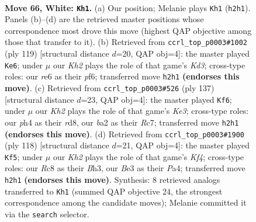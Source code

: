 \documentclass[11pt]{article}
\begin{document}
\clearpage

\begin{figure}[p]\centering
\begin{subfigure}{0.46\textwidth}\centering
\resizebox{\linewidth}{!}{%
\newchessgame
\chessboard[
  setfen={2R5/7k/4r3/8/B3p2p/4Bp1P/b4P1K/8 w - - 42 66},
  showmover=false,
  pgfstyle=straightmove, color=movearrow, markmove={h2-h1}
]}
\caption{}
\end{subfigure}\hfill
\begin{subfigure}{0.46\textwidth}\centering
\resizebox{\linewidth}{!}{%
\newchessgame
\chessboard[
  setfen={7B/7p/3k1P1P/8/p7/Pb1K4/1P6/8 b - - 18 60},
  showmover=false,
  pgfstyle=straightmove, color=movearrow, markmove={d6-e6}
]}
\caption{}
\end{subfigure}
\\[4pt]
\begin{subfigure}{0.46\textwidth}\centering
\resizebox{\linewidth}{!}{%
\newchessgame
\chessboard[
  setfen={3R4/2r4p/Bp2k3/2b2p1P/P1P2P2/8/6K1/8 b - - 58 69},
  showmover=false,
  pgfstyle=straightmove, color=movearrow, markmove={e6-f6}
]}
\caption{}
\end{subfigure}\hfill
\begin{subfigure}{0.46\textwidth}\centering
\resizebox{\linewidth}{!}{%
\newchessgame
\chessboard[
  setfen={3k4/5p2/1p6/p1b1P3/P4K1p/1P5B/8/8 w - - 36 60},
  showmover=false,
  pgfstyle=straightmove, color=movearrow, markmove={f4-f5}
]}
\caption{}
\end{subfigure}
\caption{\textbf{Move 66, White: \texttt{Kh1}.} (a) Our position; Melanie plays \texttt{Kh1} (\texttt{h2h1}). Panels (b)--(d) are the retrieved master positions whose correspondence most drove this move (highest QAP objective among those that transfer to it). (b) Retrieved from \texttt{ccrl\_top\_p0003\#1002} (ply 119) [structural distance $d$=20, QAP obj=4]: the master played \texttt{Ke6}; under $\mu$ our \emph{Kh2} plays the role of that game's \emph{Kd3}; cross-type roles: our \emph{r}e6 as their \emph{p}f6; transferred move \texttt{h2h1} \textbf{(endorses this move)}. (c) Retrieved from \texttt{ccrl\_top\_p0003\#526} (ply 137) [structural distance $d$=23, QAP obj=4]: the master played \texttt{Kf6}; under $\mu$ our \emph{Kh2} plays the role of that game's \emph{Ke3}; cross-type roles: our \emph{p}h4 as their \emph{r}d8, our \emph{b}a2 as their \emph{R}c7; transferred move \texttt{h2h1} \textbf{(endorses this move)}. (d) Retrieved from \texttt{ccrl\_top\_p0003\#1900} (ply 118) [structural distance $d$=21, QAP obj=4]: the master played \texttt{Kf5}; under $\mu$ our \emph{Kh2} plays the role of that game's \emph{Kf4}; cross-type roles: our \emph{R}c8 as their \emph{B}h3, our \emph{B}e3 as their \emph{P}a4; transferred move \texttt{h2h1} \textbf{(endorses this move)}. Synthesis: 8 retrieved analogs transferred to \texttt{Kh1} (summed QAP objective 24, the strongest correspondence among the candidate moves); Melanie committed it via the \texttt{search} selector.}
\label{fig:thought-m130}
\end{figure}
\end{document}
